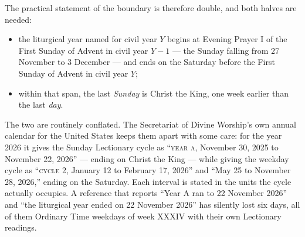 The practical statement of the boundary is therefore double, and both halves are needed:

\begin{itemize}
\item the liturgical year named for civil year $Y$ begins at Evening Prayer I of the First Sunday of
Advent in civil year $Y-1$ --- the Sunday falling from 27 November to 3 December --- and ends on the
Saturday before the First Sunday of Advent in civil year $Y$;
\item within that span, the last \emph{Sunday} is Christ the King, one week earlier than the last
\emph{day}.
\end{itemize}

The two are routinely conflated. The Secretariat of Divine Worship's own annual calendar for the
United States keeps them apart with some care: for the year 2026 it gives the Sunday Lectionary
cycle as ``\textsc{year a}, November 30, 2025 to November 22, 2026'' --- ending on Christ the King
--- while giving the weekday cycle as ``\textsc{cycle 2}, January 12 to February 17, 2026'' and ``May
25 to November 28, 2026,'' ending on the Saturday. Each interval is stated in the units the cycle
actually occupies. A reference that reports ``Year A ran to 22 November 2026'' and ``the liturgical
year ended on 22 November 2026'' has silently lost six days, all of them Ordinary Time weekdays of
week XXXIV with their own Lectionary readings.

